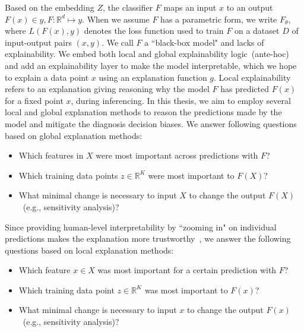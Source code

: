 \hspace*{3.5mm} Based on the embedding $Z$, the classifier $F$ maps an input $x$ to an output $F(x) \in y, F: \mathbb{R}^{d} \mapsto y$. When we assume $F$ has a parametric form, we write $F_{\theta}$, where ${L}(F(x), y)$ denotes the loss function used to train $F$ on a dataset $D$ of input-output pairs $(x,y)$. We call $F$ a ``black-box model" and lacks of explainability. We embed both local and global explainability logic~(ante-hoc) and add an explainability layer to make the model interpretable, which we hope to explain a data point $x$ using an explanation function $g$. Local explainability refers to an explanation giving reasoning why the model $F$ has predicted $F(x)$ for a fixed point $x$, during inferencing. In this thesis, we aim to employ several local and global explanation methods to reason the predictions made by the model and mitigate the diagnosis decision biases. We answer following questions based on global explanation methods: 

\vspace{-4mm}
\begin{itemize}[noitemsep]
    \item Which features in $X$ were most important across predictions with $F$? 
    \item Which training data points $z \in \mathbb{R}^{K}$ were most important to $F(X)$? 
    \item What minimal change is necessary to input $X$ to change the output $F(X)$~(e.g., sensitivity analysis)? 
\end{itemize}
\vspace{-4mm}

Since providing human-level interpretability by ``zooming in" on individual predictions makes the explanation more trustworthy~\cite{ribeiro2018anchors}, we answer the following questions based on local explanation methods: 

\vspace{-4mm}
\begin{itemize}[noitemsep]
    \item Which feature $x \in X$ was most important for a certain prediction with $F$? 
    \item Which training data point $z \in \mathbb{R}^{K}$ was most important to $F(x)$? 
    \item What minimal change is necessary to input $x$ to change the output $F(x)$~(e.g., sensitivity analysis)? 
\end{itemize}
\vspace{-4mm}

